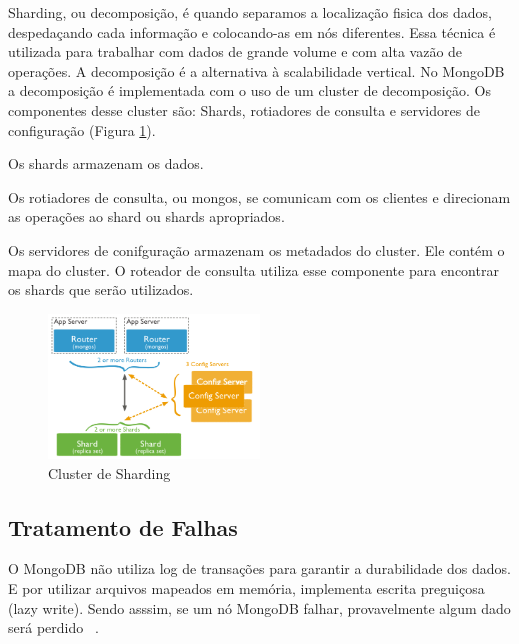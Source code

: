 Sharding, ou decomposição, é quando separamos a localização fisica dos dados, despedaçando cada informação e colocando-as em nós diferentes. Essa técnica é utilizada para trabalhar com dados de grande volume e com alta vazão de operações. A decomposição é a alternativa à scalabilidade vertical. No MongoDB a decomposição é implementada com o uso de um cluster de decomposição. Os componentes desse cluster são: Shards, rotiadores de consulta e servidores de configuração (Figura \ref{fig:sharding}).

Os shards armazenam os dados.

Os rotiadores de consulta, ou mongos, se comunicam com os clientes e direcionam as operações ao shard ou shards apropriados.

Os servidores de conifguração armazenam os metadados do cluster. Ele contém o mapa do cluster. O roteador de consulta utiliza esse componente para encontrar os shards que serão utilizados.

	\begin{figure}[!htbp]
		\begin{center}
			\includegraphics[width=0.5\textwidth]{sharding}
		\end{center}
		\caption{Cluster de Sharding ~\cite{sitemongodb}}
		\label{fig:sharding}
	\end{figure}

\subsection{Tratamento de Falhas}

O MongoDB não utiliza log de transações para garantir a durabilidade dos dados. E por utilizar arquivos mapeados em memória, implementa escrita preguiçosa (lazy write). Sendo asssim, se um nó MongoDB falhar, provavelmente algum dado será perdido ~\cite{Orendanalysisand}.














